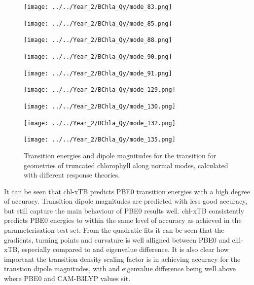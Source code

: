 \begin{figure}
    \centering
    \texttt{[image: ../../Year\_2/BChla\_Qy/mode\_83.png]}
    \label{fig:mode_83}
\end{figure}

\begin{figure}
    \centering
    \texttt{[image: ../../Year\_2/BChla\_Qy/mode\_85.png]}
    \label{fig:mode_85}
\end{figure}

\begin{figure}
    \centering
    \texttt{[image: ../../Year\_2/BChla\_Qy/mode\_88.png]}
    \label{fig:mode_88}
\end{figure}

\begin{figure}
    \centering
    \texttt{[image: ../../Year\_2/BChla\_Qy/mode\_90.png]}
    \label{fig:mode_90}
\end{figure}

\begin{figure}
    \centering
    \texttt{[image: ../../Year\_2/BChla\_Qy/mode\_91.png]}
    \label{fig:mode_91}
\end{figure}

\begin{figure}
    \centering
    \texttt{[image: ../../Year\_2/BChla\_Qy/mode\_129.png]}
    \label{fig:mode_129}
\end{figure}

\begin{figure}
    \centering
    \texttt{[image: ../../Year\_2/BChla\_Qy/mode\_130.png]}
    \label{fig:mode_130}
\end{figure}

\begin{figure}
    \centering
    \texttt{[image: ../../Year\_2/BChla\_Qy/mode\_132.png]}
    \label{fig:mode_132}
\end{figure}

\begin{figure}
    \centering
    \texttt{[image: ../../Year\_2/BChla\_Qy/mode\_135.png]}
    \label{fig:mode_135}
    \caption{Transition energies and dipole magnitudes for the \Qy transition for
    geometries of truncated chlorophyll along normal modes, calculated with different
    response theories.}
\end{figure}

It can be seen that chl-xTB predicts PBE0 transition energies with a high degree
of accuracy. Transition dipole magnitudes are predicted with less good accuracy,
but still capture the main behaviour of PBE0 results well. chl-xTB consistently 
predicts PBE0 energies to within the same level of accuracy as achieved in the 
parameterisation test set. From the quadratic fits it can be seen that the gradients, 
turning points and curvature is well alligned between PBE0 and chl-xTB, especially
compared to \dscf and eigenvalue difference. It is also clear how important the
transition density scaling factor is in achieving accuracy for the transtion dipole
magnitudes, with \dscf and eigenvalue difference being well above where PBE0 and
CAM-B3LYP values sit.

